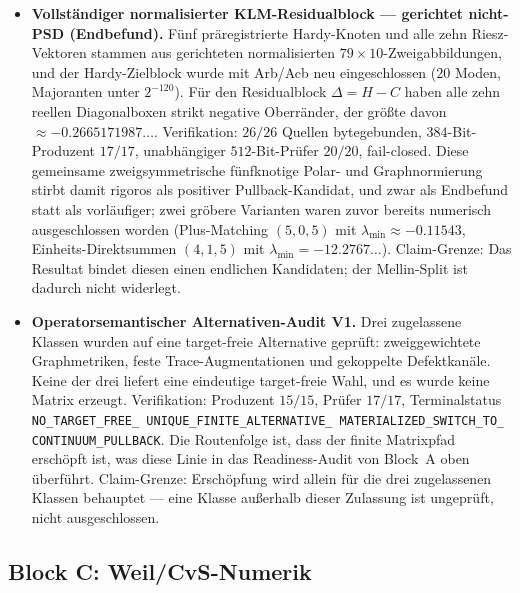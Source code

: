\documentclass[12pt,a4paper]{article}
\theoremstyle{definition}
\theoremstyle{remark}
\begin{document}
\begin{itemize}
  \item \textbf{Vollständiger normalisierter KLM-Residualblock ---
    gerichtet nicht-PSD (Endbefund).} Fünf präregistrierte Hardy-Knoten und
    alle zehn Riesz-Vektoren stammen aus gerichteten normalisierten
    $79\times 10$-Zweigabbildungen, und der Hardy-Zielblock wurde mit
    Arb/Acb neu eingeschlossen ($20$ Moden, Majoranten unter $2^{-120}$).
    Für den Residualblock $\Delta = H - C$ haben alle zehn reellen
    Diagonalboxen strikt negative Oberränder, der größte davon
    $\approx -0.2665171987\ldots$. Verifikation: $26/26$ Quellen
    bytegebunden, $384$-Bit-Produzent $17/17$, unabhängiger
    $512$-Bit-Prüfer $20/20$, fail-closed. Diese gemeinsame
    zweigsymmetrische fünfknotige Polar- und Graphnormierung stirbt damit
    rigoros als positiver Pullback-Kandidat, und zwar als Endbefund statt
    als vorläufiger; zwei gröbere Varianten waren zuvor bereits numerisch
    ausgeschlossen worden (Plus-Matching $(5,0,5)$ mit
    $\lambda_{\min} \approx -0.11543$, Einheits-Direktsummen $(4,1,5)$ mit
    $\lambda_{\min} = -12.2767\ldots$). Claim-Grenze: Das Resultat bindet
    diesen einen endlichen Kandidaten; der Mellin-Split ist dadurch nicht
    widerlegt.

  \item \textbf{Operatorsemantischer Alternativen-Audit V1.} Drei
    zugelassene Klassen wurden auf eine target-freie Alternative geprüft:
    zweiggewichtete Graphmetriken, feste Trace-Augmentationen und
    gekoppelte Defektkanäle. Keine der drei liefert eine eindeutige
    target-freie Wahl, und es wurde keine Matrix erzeugt. Verifikation:
    Produzent $15/15$, Prüfer $17/17$, Terminalstatus
    \texttt{NO\_\allowbreak TARGET\_\allowbreak FREE\_\allowbreak
    UNIQUE\_\allowbreak FINITE\_\allowbreak ALTERNATIVE\_\allowbreak
    MATERIALIZED\_\allowbreak SWITCH\_\allowbreak TO\_\allowbreak
    CONTINUUM\_\allowbreak PULLBACK}. Die Routenfolge ist, dass der finite
    Matrixpfad erschöpft ist, was diese Linie in das Readiness-Audit von
    Block~A oben überführt. Claim-Grenze: Erschöpfung wird allein für die
    drei zugelassenen Klassen behauptet --- eine Klasse außerhalb dieser
    Zulassung ist ungeprüft, nicht ausgeschlossen.
\end{itemize}

\subsection{Block C: Weil/CvS-Numerik}
\label{sec:v32-block-c}
\end{document}
